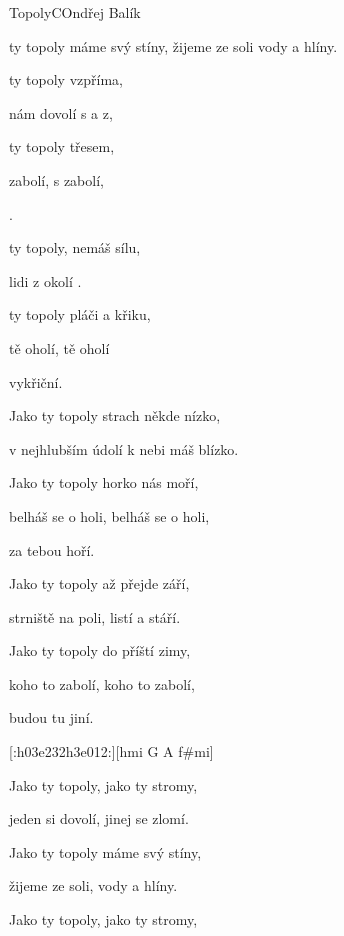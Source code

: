\setcounter{page}{89}
\begin{song}{Topoly}{C}{Ondřej Balík}
\begin{SBChorus*}
 ty topoly máme svý stíny, žijeme ze soli vody a hlíny.
\end{SBChorus*}
\begin{SBVerse}
 ty topoly  vzpříma, 

 nám dovolí s a z,

 ty topoly  třesem,

 zabolí, s zabolí,

 .

 ty topoly,  nemáš sílu,

 lidi z okolí  .

 ty topoly  pláči a křiku,

 tě oholí,  tě oholí

 vykřiční.
\end{SBVerse}
\begin{multicols}{2}
\begin{scriptsize}
\begin{SBVerse}
Jako ty topoly strach někde nízko,

v nejhlubším údolí k nebi máš blízko.

Jako ty topoly horko nás moří,

belháš se o holi, belháš se o holi,

za tebou hoří.

Jako ty topoly až přejde září,

strniště na poli, listí a stáří.

Jako ty topoly do příští zimy,

koho to zabolí, koho to zabolí,

budou tu jiní.
\end{SBVerse}
[:h03e232h3e012:][hmi G A f\#mi]
\begin{SBVerse}
Jako ty topoly, jako ty stromy,

jeden si dovolí, jinej se zlomí.

Jako ty topoly máme svý stíny,

žijeme ze soli, vody a hlíny.

Jako ty topoly, jako ty stromy,


\end{SBVerse}
\end{scriptsize}
\end{multicols}
\end{song}
